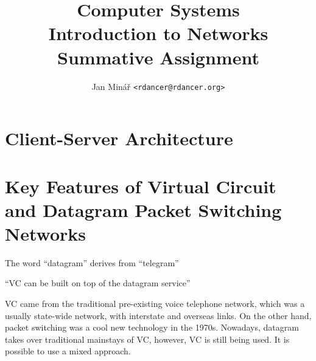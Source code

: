 \documentclass[10pt]{report}
\author{Jan Minář {\tt <rdancer@rdancer.org>}}
\title{Computer Systems\\Introduction to Networks\\Summative Assignment}
\begin{document}


\maketitle




\chapter{Client-Server Architecture}




\chapter{Key Features of Virtual Circuit and Datagram Packet Switching
	Networks}


The word ``datagram'' derives from ``telegram'' \cite[p 141]{russell}


``VC can be built on top of the datagram service'' \cite[p 141]{russell}

VC came from the traditional pre-existing voice telephone network, which was a usually state-wide network, with interstate and overseas links.  On the other hand, packet switching was a cool new technology in the 1970s.  Nowadays, datagram takes over traditional mainstays of VC, however, VC is still being used.  It is possible to use a mixed approach.
\end{document}
